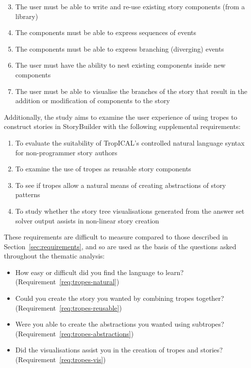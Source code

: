 \documentclass[11pt]{report}
\begin{document}
\begin{enumerate}[R1.]
  \setcounter{enumi}{2}
  \item The user must be able to write and re-use
    existing story components (from a library)
  \item The components must be able to express sequences of
    events
  \item The components must be able to express branching
    (diverging) events
  \item The user must have the ability to nest existing
    components inside new components
  \item The user must be able to visualise the branches of the
    story that result in the addition or modification of components to the
    story
\end{enumerate}

Additionally, the study aims to examine the user experience of using tropes to
construct stories in StoryBuilder with the following supplemental requirements:

\begin{enumerate}[S1.]
  \item\label{req:tropes-natural} To evaluate the suitability of TropICAL's controlled natural language
    syntax for non-programmer story authors
  \item\label{req:tropes-reusable} To examine the use of tropes as reusable story components
  \item\label{req:tropes-abstractions} To see if tropes allow a natural means of creating abstractions of story patterns
  \item\label{req:tropes-vis} To study whether the story tree visualisations
    generated from the answer set solver output assists in non-linear story creation
\end{enumerate}

These requirements are difficult to measure compared to those described in
Section~\ref{sec:requirements}, and so are used as the basis of the questions
asked throughout the thematic analysis:

\begin{itemize}
  \item How easy or difficult did you find the language to learn? (Requirement~\ref{req:tropes-natural})
  \item Could you create the story you wanted by combining tropes together? (Requirement~\ref{req:tropes-reusable})
  \item Were you able to create the abstractions you wanted using subtropes? (Requirement~\ref{req:tropes-abstractions})
  \item Did the visualisations assist you in the creation of tropes and stories? (Requirement~\ref{req:tropes-vis})
\end{itemize}
\end{document}
